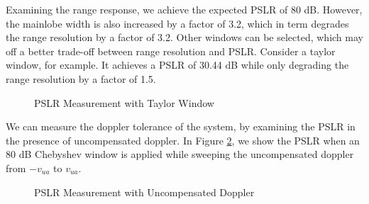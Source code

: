 \documentclass[conference]{IEEEtran}
\begin{document}
	Examining the range response, we achieve the expected PSLR of 80 dB. However, the mainlobe width is also increased by a factor of 3.2, which in term degrades the range resolution by a factor of 3.2. Other windows can be selected, which may off a better trade-off between range resolution and PSLR. Consider a taylor window, for example. It achieves a PSLR of 30.44 dB while only degrading the range resolution by a factor of 1.5.
	
	\begin{figure}[H]
	    	\centering
	    	\caption{PSLR Measurement with Taylor Window}
	    	\label{fig::plsr_taylor_window} 
	\end{figure}
	
	We can measure the doppler tolerance of the system, by examining the PSLR in the presence of uncompensated doppler. In Figure \ref{fig::doppler_tolerance}, we show the PSLR when an 80 dB Chebyshev window is applied while sweeping the uncompensated doppler from $-v_{ua}$ to $v_{ua}$.
	
	\begin{figure}[H]
		\centering
	    	\caption{PSLR Measurement with Uncompensated Doppler}
	    	\label{fig::doppler_tolerance} 
	\end{figure}
	
\end{document}
